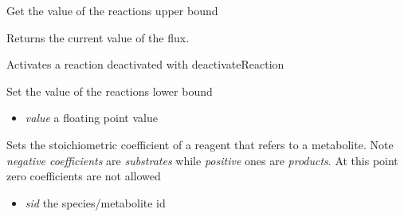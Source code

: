 \documentclass[a4paper,11pt,english]{sphinxmanual}
\begin{document}
\begin{fulllineitems}
\begin{fulllineitems}
\begin{itemize}
\end{itemize}

\end{fulllineitems}


\begin{fulllineitems}
\label{modules_doc:cbmpy.CBModel.Reaction.getUpperBound}
Get the value of the reactions upper bound

\end{fulllineitems}


\begin{fulllineitems}
\label{modules_doc:cbmpy.CBModel.Reaction.getValue}
Returns the current value of the flux.

\end{fulllineitems}


\begin{fulllineitems}
\label{modules_doc:cbmpy.CBModel.Reaction.reactivateReaction}
Activates a reaction deactivated with deactivateReaction

\end{fulllineitems}


\begin{fulllineitems}
\label{modules_doc:cbmpy.CBModel.Reaction.setLowerBound}
Set the value of the reactions lower bound
\begin{itemize}
\item {} 
\emph{value} a floating point value

\end{itemize}

\end{fulllineitems}


\begin{fulllineitems}
\label{modules_doc:cbmpy.CBModel.Reaction.setStoichCoefficient}
Sets the stoichiometric coefficient of a reagent that refers to a metabolite. Note \emph{negative coefficients} are \emph{substrates}
while \emph{positive} ones are \emph{products}. At this point zero coefficients are not allowed
\begin{itemize}
\item {} 
\emph{sid} the species/metabolite id


\end{itemize}
\end{fulllineitems}
\end{fulllineitems}
\end{document}
